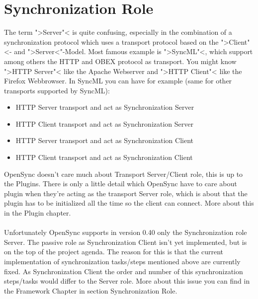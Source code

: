 \section{Synchronization Role}
The term ">Server"< is quite confusing,
especially in the combination of a synchronization protocol which uses a
transport protocol based on the ">Client"<- and ">Server<"-Model. Most famous
example is ">SyncML"<, which support among others the HTTP and OBEX protocol as
transport. You might know ">HTTP Server"< like the Apache Webserver and ">HTTP
Client"< like the Firefox Webbrowser. In SyncML you can have for example (same 
for other transports supported by SyncML):
\begin{itemize}
\item HTTP Server transport and act as Synchronization Server
\item HTTP Client transport and act as Synchronization Server
\item HTTP Server transport and act as Synchronization Client
\item HTTP Client transport and act as Synchronization Client
\end{itemize}
OpenSync doesn't care much about Transport Server/Client role, this is
up to the Plugins. There is only a little detail which OpenSync have to care
about plugin when they're acting as the transport Server role, which is about
that the plugin has to be initialized all the time so the client can connect.
More about this in the Plugin chapter.\\
\\
Unfortunately OpenSync supports in version 0.40 only the Synchronization role
Server. The passive role as Synchronization Client isn't yet implemented, but is
on the top of the project agenda. The reason for this is that the current
implementation of synchronization tasks/steps mentioned above are currently
fixed. As Synchronization Client the order and number of this synchronization 
steps/tasks would differ to the Server role. More about this issue you can find
in the Framework Chapter in section Synchronization Role.

